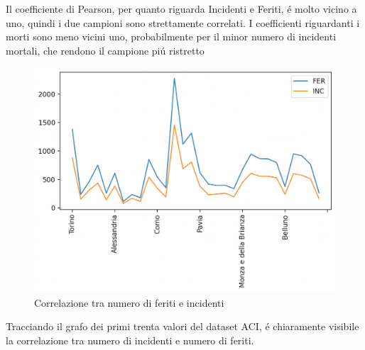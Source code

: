 \documentclass[a4paper]{report}
\begin{document}
Il coefficiente di Pearson, per quanto riguarda Incidenti e Feriti, 
\'e molto vicino a uno, quindi i due campioni sono strettamente correlati.
I coefficienti riguardanti i morti sono meno vicini uno, probabilmente per il minor numero 
di incidenti mortali, che rendono il campione pi\'u ristretto

\begin{figure}[!ht]
    \includegraphics[width=\linewidth]{../src/incidenti/incidenti_aci/comuni/corr_incidenti_feriti.png}
    \caption{Correlazione tra numero di feriti e incidenti}
    \label{fig:corr_incidenti_feriti}
\end{figure}

Tracciando il grafo dei primi trenta valori del dataset ACI, 
\'e chiaramente visibile la correlazione tra numero di incidenti e numero di feriti.



\newpage
\end{document}
